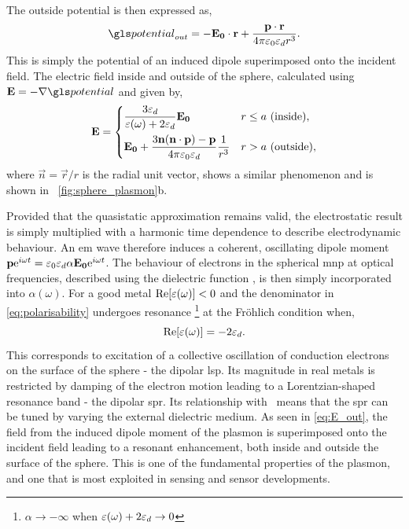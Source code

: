 \documentclass{article}
\begin{document}
The outside potential is then expressed as,
\begin{equation}
	\pot_{out} = -\vec{E_0}\cdot\vec{r} + \frac{\vec{p}\cdot\vec{r}}{4\pi\epsfs\epsdi r^3}.
\end{equation}
This is simply the potential of an induced dipole superimposed onto the incident field. The electric field inside and outside of the sphere, calculated using $\vec{E}=-\nabla\pot$ and given by,
\begin{equation}
	\mathbf{E} =
	\begin{dcases}
	\frac{3\varepsilon_d}{\varepsilon(\omega)+2\varepsilon_d} \mathbf{E_0} & r \leq a\text{ (inside)}, \\
	\mathbf{E_0} + \frac{3\mathbf{n}(\mathbf{n}\cdot\mathbf{p}) - \mathbf{p}}{4\pi\varepsilon_0\varepsilon_d}\frac{1}{r^3} & r > a\text{ (outside)},
	\end{dcases}
	\label{eq:E_out}
\end{equation}
where $\vec{n}=\vec{r}/r$ is the radial unit vector, shows a similar phenomenon and is shown in \figurename~\ref{fig:sphere_plasmon}b.

Provided that the quasistatic approximation remains valid, the electrostatic result is simply multiplied with a harmonic time dependence to describe electrodynamic behaviour. An \gls{em} wave therefore induces a coherent, oscillating dipole moment $\mathbf{p}\mathrm{e}^{i\omega t}=\varepsilon_0\varepsilon_d\alpha\mathbf{E_0}\mathrm{e}^{i\omega t}$. The behaviour of electrons in the spherical \gls{mnp} at optical frequencies, described using the dielectric function \dielectric, is then simply incorporated into $\alpha(\omega)$. For a good metal $\mathrm{Re}\!\left[{\varepsilon(\omega)}\right]<0$ and the denominator in \eqref{eq:polarisability} undergoes resonance%
\footnote{$\alpha\rightarrow-\infty$ when $\varepsilon(\omega)+2\varepsilon_d\rightarrow0$}
at the Fr\"{o}hlich condition when,
\begin{equation}
	\mathrm{Re}\!\left[{\varepsilon(\omega)}\right] = -2\varepsilon_d. \label{eq:frohlich}
\end{equation}
This corresponds to excitation of a collective oscillation of conduction electrons on the surface of the sphere - the dipolar \gls{lsp}. Its magnitude in real metals is restricted by damping of the electron motion leading to a Lorentzian-shaped resonance band - the dipolar \gls{spr}. Its relationship with \epsdi\ means that the \gls{spr} can be tuned by varying the external dielectric medium. As seen in \eqref{eq:E_out}, the field from the induced dipole moment of the plasmon is superimposed onto the incident field leading to a resonant enhancement, both inside and outside the surface of the sphere. This is one of the fundamental properties of the plasmon, and one that is most exploited in sensing and sensor developments.
\end{document}
